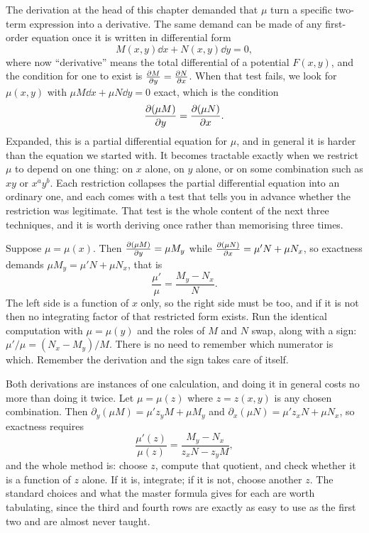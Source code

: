 The derivation at the head of this chapter demanded that $\mu$ turn a specific two-term expression into a derivative. The same demand can be made of any first-order equation once it is written in differential form
\[M(x,y)\dd x+N(x,y)\dd y=0,\]
where now ``derivative'' means the total differential of a potential $F(x,y)$, and the condition for one to exist is $\frac{\partial M}{\partial y}=\frac{\partial N}{\partial x}$. When that test fails, we look for $\mu(x,y)$ with $\mu M\dd x+\mu N\dd y=0$ exact, which is the condition
\[\frac{\partial (\mu M)}{\partial y}=\frac{\partial (\mu N)}{\partial x}.\]
Expanded, this is a partial differential equation for $\mu$, and in general it is harder than the equation we started with. It becomes tractable exactly when we restrict $\mu$ to depend on one thing: on $x$ alone, on $y$ alone, or on some combination such as $xy$ or $x^{a}y^{b}$. Each restriction collapses the partial differential equation into an ordinary one, and each comes with a test that tells you in advance whether the restriction was legitimate. That test is the whole content of the next three techniques, and it is worth deriving once rather than memorising three times.

Suppose $\mu=\mu(x)$. Then $\frac{\partial (\mu M)}{\partial y}=\mu M_y$ while $\frac{\partial (\mu N)}{\partial x}=\mu'N+\mu N_x$, so exactness demands $\mu M_y=\mu'N+\mu N_x$, that is
\[\frac{\mu'}{\mu}=\frac{M_y-N_x}{N}.\]
The left side is a function of $x$ only, so the right side must be too, and if it is not then no integrating factor of that restricted form exists. Run the identical computation with $\mu=\mu(y)$ and the roles of $M$ and $N$ swap, along with a sign: $\mu'/\mu=(N_x-M_y)/M$. There is no need to remember which numerator is which. Remember the derivation and the sign takes care of itself.

Both derivations are instances of one calculation, and doing it in general costs no more than doing it twice. Let $\mu=\mu(z)$ where $z=z(x,y)$ is any chosen combination. Then $\partial_y(\mu M)=\mu'z_yM+\mu M_y$ and $\partial_x(\mu N)=\mu'z_xN+\mu N_x$, so exactness requires
\[\frac{\mu'(z)}{\mu(z)}=\frac{M_y-N_x}{z_xN-z_yM},\]
and the whole method is: choose $z$, compute that quotient, and check whether it is a function of $z$ alone. If it is, integrate; if it is not, choose another $z$. The standard choices and what the master formula gives for each are worth tabulating, since the third and fourth rows are exactly as easy to use as the first two and are almost never taught.

